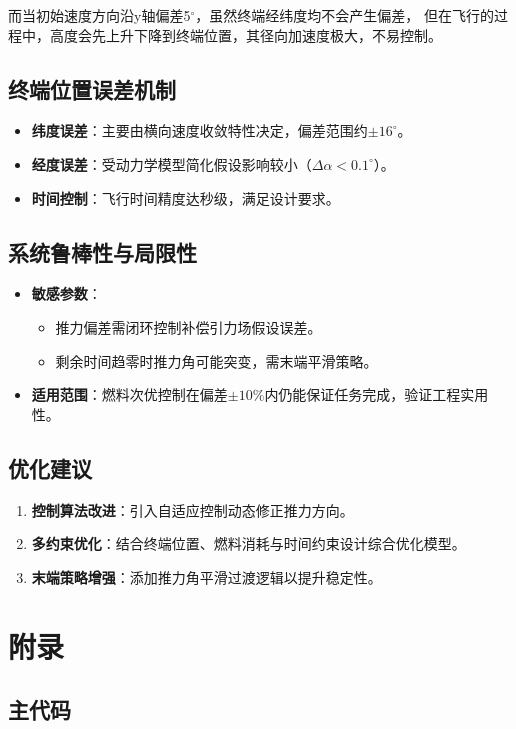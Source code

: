 \documentclass[12pt,a4paper]{article}
\begin{document}
而当初始速度方向沿y轴偏差5$^\circ$，虽然终端经纬度均不会产生偏差，
但在飞行的过程中，高度会先上升下降到终端位置，其径向加速度极大，不易控制。

\subsection{终端位置误差机制}
\begin{itemize}
    \item \textbf{纬度误差}：主要由横向速度收敛特性决定，偏差范围约$\pm 16^\circ$。
    \item \textbf{经度误差}：受动力学模型简化假设影响较小（$\Delta\alpha < 0.1^\circ$）。
    \item \textbf{时间控制}：飞行时间精度达秒级，满足设计要求。
\end{itemize}

\subsection{系统鲁棒性与局限性}
\begin{itemize}
    \item \textbf{敏感参数}：
    \begin{itemize}
        \item 推力偏差需闭环控制补偿引力场假设误差。
        \item 剩余时间趋零时推力角可能突变，需末端平滑策略。
    \end{itemize}
    \item \textbf{适用范围}：燃料次优控制在偏差$\pm 10\%$内仍能保证任务完成，验证工程实用性。
\end{itemize}

\subsection*{优化建议}
\begin{enumerate}
    \item \textbf{控制算法改进}：引入自适应控制动态修正推力方向。
    \item \textbf{多约束优化}：结合终端位置、燃料消耗与时间约束设计综合优化模型。
    \item \textbf{末端策略增强}：添加推力角平滑过渡逻辑以提升稳定性。
\end{enumerate}

\section*{附录}
\subsection*{主代码}

\end{document}
